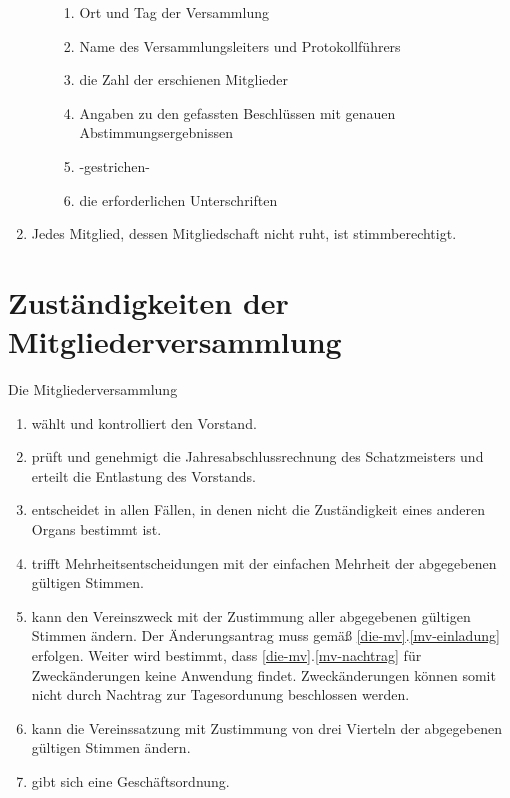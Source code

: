 \documentclass[a4paper, 12pt]{scrartcl}
\begin{document}
\begin{enumerate}
\begin{enumerate}
			\begin{enumerate}
	  		\item Ort und Tag der Versammlung
	    	\item Name des Versammlungsleiters und Protokollführers
	    	\item die Zahl der erschienen Mitglieder
	    	\item Angaben zu den gefassten Beschlüssen mit genauen Abstimmungsergebnissen
	    	\item -gestrichen-
	    	\item die erforderlichen Unterschriften
			\end{enumerate}
		\end{enumerate}
	\item Jedes Mitglied, dessen Mitgliedschaft nicht ruht, ist stimmberechtigt.
\end{enumerate}

\section{Zuständigkeiten der Mitgliederversammlung}
Die Mitgliederversammlung
\begin{enumerate}
	\item wählt und kontrolliert den Vorstand.
	\item prüft und genehmigt die Jahresabschlussrechnung des Schatzmeisters und erteilt die Entlastung des Vorstands.
	\item entscheidet in allen Fällen, in denen nicht die Zuständigkeit eines anderen Organs bestimmt ist.
	\item trifft Mehrheitsentscheidungen mit der einfachen Mehrheit der abgegebenen gültigen Stimmen.
	\item kann den Vereinszweck mit der Zustimmung aller abgegebenen gültigen Stimmen ändern. Der Änderungsantrag muss gemäß \ref{die-mv}.\ref{mv-einladung} erfolgen. Weiter wird bestimmt, dass \ref{die-mv}.\ref{mv-nachtrag} für Zweckänderungen keine Anwendung findet. Zweckänderungen können somit nicht durch Nachtrag zur Tagesordunung beschlossen werden.
	\item kann die Vereinssatzung mit Zustimmung von drei Vierteln der abgegebenen gültigen Stimmen ändern. 
	\item gibt sich eine Geschäftsordnung.
\end{enumerate}
\end{document}
